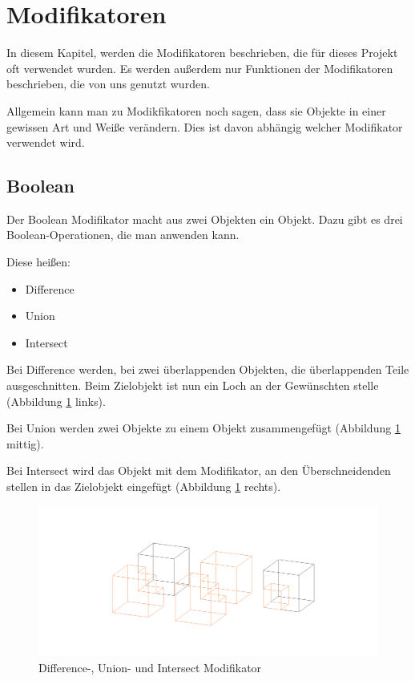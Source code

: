 \section{Modifikatoren}
In diesem Kapitel, werden die Modifikatoren beschrieben, die für dieses Projekt oft verwendet wurden.
Es werden außerdem nur Funktionen der Modifikatoren beschrieben, die von uns genutzt wurden.

Allgemein kann man zu Modikfikatoren noch sagen, dass sie Objekte in einer gewissen Art und Weiße verändern.
Dies ist davon abhängig welcher Modifikator verwendet wird.

\subsection{Boolean}\citep{blender:boolean_modifier} 
Der Boolean Modifikator macht aus zwei Objekten ein Objekt. Dazu gibt es
drei Boolean-Operationen, die man anwenden kann.

Diese heißen:
\begin{itemize}
    \item  Difference
    \item  Union
    \item  Intersect
\end{itemize}

Bei Difference werden, bei zwei überlappenden Objekten, die überlappenden Teile ausgeschnitten. Beim Zielobjekt ist nun ein Loch an der Gewünschten stelle (Abbildung \ref{modifikatoren:image1} links).

Bei Union werden zwei Objekte zu einem Objekt zusammengefügt (Abbildung \ref{modifikatoren:image1} mittig).

Bei Intersect wird das Objekt mit dem Modifikator, an den Überschneidenden stellen in das Zielobjekt eingefügt (Abbildung \ref{modifikatoren:image1} rechts).

\begin{figure}[h]
    \centering
    \includegraphics[width=.8\textwidth]{images/Modifikatoren-Boolean.png}
    \caption{Difference-, Union- und Intersect Modifikator}
    \label{modifikatoren:image1}
\end{figure}

